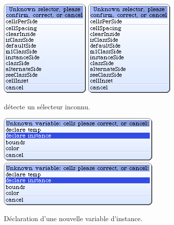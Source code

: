 \documentclass[a4paper,10pt,twoside]{book}
\begin{document}
\begin{figure}[htb]
\begin{minipage}{0.34\textwidth}
	\centering
	\ifluluelse
		{\includegraphics[width=\textwidth]{UnknownSelector}}
		{\includegraphics[scale=0.7]{UnknownSelector}}
	\caption{\sq détecte un sélecteur inconnu.\label{fig:unknownSelector}}
\end{minipage}
\hfill
\begin{minipage}{0.64\textwidth}
	\centering
	\ifluluelse
		{\includegraphics[width=\textwidth]{DeclareInstanceVar}}
		{\includegraphics[scale=0.7]{DeclareInstanceVar}}
	\caption{Déclaration d'une nouvelle variable d'instance.\label{fig:declareInstance}}
\end{minipage}
\end{figure}
\end{document}
